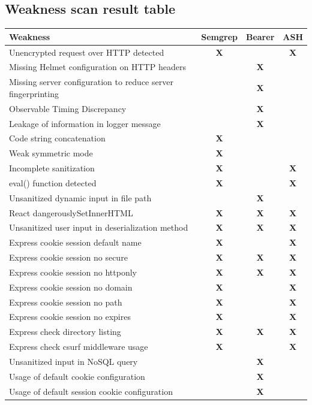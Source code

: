 \documentclass[]{article}
\newcommand{\cmark}{\textbf{X}} %
\begin{document}
\subsection{Weakness scan result table}
\begin{tabular}{| m{10cm} | c | c | c |}
\hline
\textbf{Weakness} & \textbf{Semgrep} & \textbf{Bearer} & \textbf{ASH} \\ 
\hline
Unencrypted request over HTTP detected & \cmark & & \cmark \\ 
\hline
Missing Helmet configuration on HTTP headers & & \cmark & \\ 
\hline
Missing server configuration to reduce server fingerprinting & & \cmark & \\ 
\hline
Observable Timing Discrepancy & & \cmark & \\ 
\hline
Leakage of information in logger message & & \cmark & \\ 
\hline
Code string concatenation & \cmark & & \\ 
\hline
Weak symmetric mode & \cmark & & \\ 
\hline
Incomplete sanitization & \cmark & & \cmark \\ 
\hline
eval() function detected & \cmark & & \cmark \\ 
\hline
Unsanitized dynamic input in file path & & \cmark & \\ 
\hline
React dangerouslySetInnerHTML & \cmark & \cmark & \cmark \\ 
\hline
Unsanitized user input in deserialization method & \cmark & \cmark & \cmark \\ 
\hline
Express cookie session default name & \cmark & & \cmark \\ 
\hline
Express cookie session no secure & \cmark & \cmark & \cmark \\ 
\hline
Express cookie session no httponly & \cmark & \cmark & \cmark \\ 
\hline
Express cookie session no domain & \cmark & & \cmark \\ 
\hline
Express cookie session no path & \cmark & & \cmark \\ 
\hline
Express cookie session no expires & \cmark & & \cmark \\ 
\hline
Express check directory listing & \cmark & \cmark & \cmark \\ 
\hline
Express check csurf middleware usage & \cmark & & \cmark \\ 
\hline
Unsanitized input in NoSQL query & & \cmark & \\ 
\hline
Usage of default cookie configuration & & \cmark & \\ 
\hline
Usage of default session cookie configuration & & \cmark & \\ 
\hline
\end{tabular}
\end{document}
